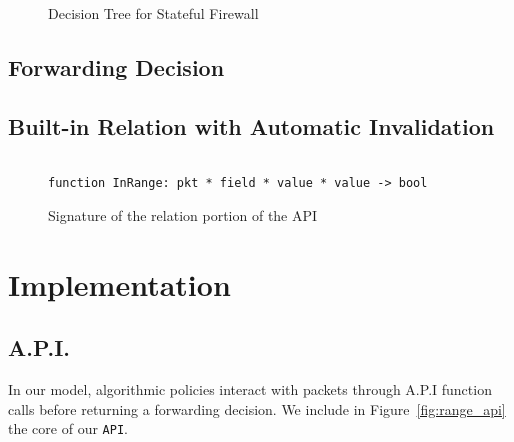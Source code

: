 \documentclass[11pt]{article}
\begin{document}
  \begin{figure}
\label{fig:decisiontree}  
\caption{Decision Tree for Stateful Firewall}     
\end{figure}
   

   

   \subsection*{Forwarding Decision}

   
   \subsection*{Built-in Relation with Automatic Invalidation}

   \begin{figure}
     \begin{lstlisting}
       
function InRange: pkt * field * value * value -> bool

\end{lstlisting}

\caption{Signature of the relation portion of the API}
\end{figure}

   
   
\section*{Implementation}

\subsection*{A.P.I.}
In our model, algorithmic policies interact with packets through A.P.I function calls before returning a forwarding decision. We include in Figure~\ref{fig:range_api} the core of our \lstinline|API|. 
\end{document}
